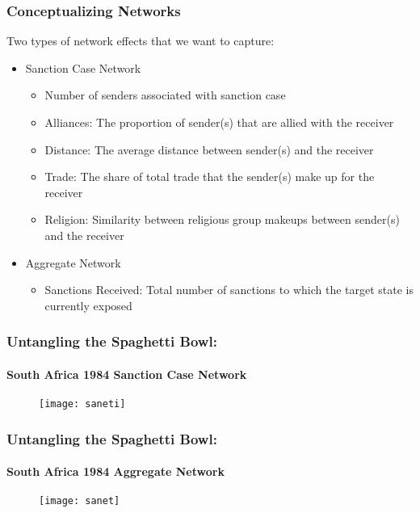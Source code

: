 \documentclass{beamer}
\begin{document}
\begin{frame}
\frametitle{Conceptualizing Networks}

Two types of network effects that we want to capture:

\begin{itemize}
	\item Sanction Case Network
	\begin{itemize}
		\item Number of senders associated with sanction case
		\item Alliances: The proportion of sender(s) that are allied with the receiver
		\item Distance: The average distance between sender(s) and the receiver
		\item Trade: The share of total trade that the sender(s) make up for the receiver
		\item Religion: Similarity between religious group makeups between sender(s) and the receiver
	\end{itemize}
	\item Aggregate Network
	\begin{itemize}
		\item Sanctions Received: Total number of sanctions to which the target state is currently exposed
	\end{itemize}
\end{itemize}

\end{frame}

\begin{frame}
\frametitle{Untangling the Spaghetti Bowl:}
\framesubtitle{South Africa 1984 Sanction Case Network}

\vspace{-.4cm}
\begin{figure}[ht]
	\centering
	\texttt{[image: saneti]}
\end{figure}

\end{frame}

\begin{frame}
\frametitle{Untangling the Spaghetti Bowl:}
\framesubtitle{South Africa 1984 Aggregate Network}

\begin{figure}[ht]
	\centering
	\texttt{[image: sanet]}
\end{figure}

\end{frame}
\end{document}
